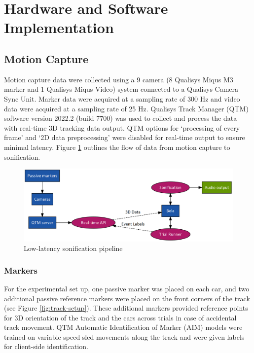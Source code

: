 \documentclass[10pt,a4paper,onecolumn]{article}
\begin{document}
\hypertarget{hardware-and-software-implementation}{%
\section{Hardware and Software Implementation}\label{hardware-and-software-implementation}}

\hypertarget{motion-capture}{%
\subsection{Motion Capture}\label{motion-capture}}

Motion capture data were collected using a 9 camera (8 Qualisys Miqus M3 marker and 1 Qualisys Miqus Video) system connected to a Qualisys Camera Sync Unit. Marker data were acquired at a sampling rate of 300 Hz and video data were acquired at a sampling rate of 25 Hz. Qualisys Track Manager (QTM) software version 2022.2 (build 7700) was used to collect and process the data with real-time 3D tracking data output. QTM options for `processing of every frame' and `2D data preprocessing' were disabled for real-time output to ensure minimal latency. Figure \ref{fig:exp-graph} outlines the flow of data from motion capture to sonification.

\begin{figure}

{\centering \includegraphics[width=1\linewidth]{figures/exp-graph} 

}

\caption{Low-latency sonification pipeline}\label{fig:exp-graph}
\end{figure}

\hypertarget{markers}{%
\subsubsection{Markers}\label{markers}}

For the experimental set up, one passive marker was placed on each car, and two additional passive reference markers were placed on the front corners of the track (see Figure \ref{fig:track-setup}). These additional markers provided reference points for 3D orientation of the track and the cars across trials in case of accidental track movement. QTM Automatic Identification of Marker (AIM) models were trained on variable speed sled movements along the track and were given labels for client-side identification.
\end{document}
